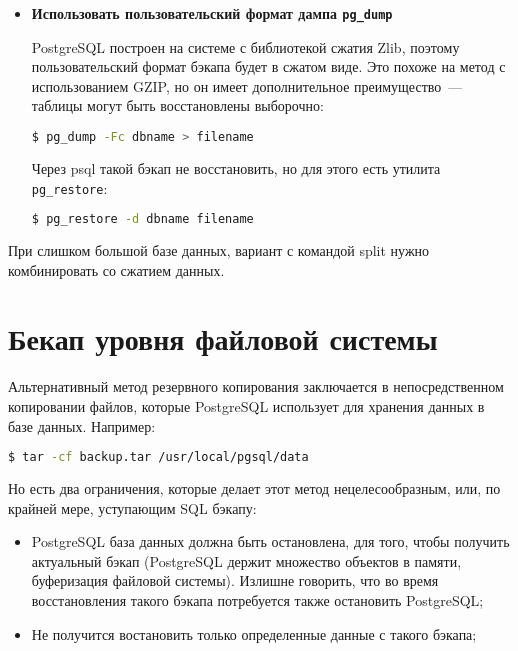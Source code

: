 \begin{itemize}
  \item \textbf{Использовать пользовательский формат дампа \lstinline!pg_dump!}

PostgreSQL построен на системе с библиотекой сжатия Zlib, поэтому пользовательский формат бэкапа будет в сжатом виде. Это похоже на метод с использованием GZIP, но он имеет дополнительное преимущество~--- таблицы могут быть восстановлены выборочно:

\begin{lstlisting}[language=Bash,label=lst:backups12,caption=Создание бэкапа PostgreSQL]
$ pg_dump -Fc dbname > filename
\end{lstlisting}

Через psql такой бэкап не восстановить, но для этого есть утилита \lstinline!pg_restore!:

\begin{lstlisting}[language=Bash,label=lst:backups13,caption=Восстановление бэкапа PostgreSQL]
$ pg_restore -d dbname filename
\end{lstlisting}

\end{itemize}

При слишком большой базе данных, вариант с командой split нужно комбинировать со сжатием данных.


\section{Бекап уровня файловой системы}

Альтернативный метод резервного копирования заключается в непосредственном копировании файлов, которые PostgreSQL использует для хранения данных в базе данных. Например:

\begin{lstlisting}[language=Bash,label=lst:backups14,caption=Бэкап PostgreSQL файлов]
$ tar -cf backup.tar /usr/local/pgsql/data
\end{lstlisting}

Но есть два ограничения, которые делает этот метод нецелесообразным, или, по крайней мере, уступающим SQL бэкапу:

\begin{itemize}
  \item PostgreSQL база данных должна быть остановлена, для того, чтобы получить актуальный бэкап (PostgreSQL держит множество объектов в памяти, буферизация файловой системы). Излишне говорить, что во время восстановления такого бэкапа потребуется также остановить PostgreSQL;
  \item Не получится востановить только определенные данные с такого бэкапа;
\end{itemize}

